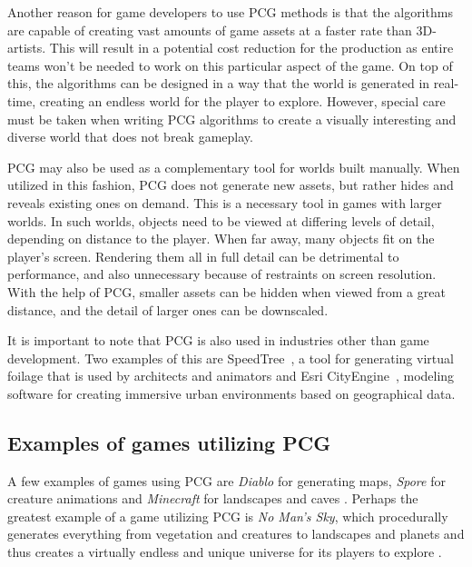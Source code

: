  
Another reason for game developers to use PCG methods is that the algorithms are capable of creating vast amounts of game assets at a faster rate than 3D-artists. This will result in a potential cost reduction for the production as entire teams won't be needed to work on this particular aspect of the game. On top of this, the algorithms can be designed in a way that the world is generated in real-time, creating an endless world for the player to explore. However, special care must be taken when writing PCG algorithms to create a visually interesting and diverse world that does not break gameplay.



PCG may also be used as a complementary tool for worlds built manually. When utilized in this fashion, PCG does not generate new assets, but rather hides and reveals existing ones on demand. This is a necessary tool in games with larger worlds. In such worlds, objects need to be viewed at differing levels of detail, depending on distance to the player. When far away, many objects fit on the player's screen. Rendering them all in full detail can be detrimental to performance, and also unnecessary because of restraints on screen resolution. With the help of PCG, smaller assets can be hidden when viewed from a great distance, and the detail of larger ones can be downscaled. \cite[p. 57]{shaker2016procedural}

It is important to note that PCG is also used in industries other than game development. Two examples of this are SpeedTree~\cite{SpeedTree}, a tool for generating virtual foilage that is used by architects and animators and Esri CityEngine~\cite{CityEngine}, modeling software for creating immersive urban environments based on geographical data.


\subsection{Examples of games utilizing PCG}

A few examples of games using PCG are \textit{Diablo} for generating maps, \textit{Spore} for creature animations and \textit{Minecraft} for landscapes and caves \cite[p. 5]{shaker2016procedural}. Perhaps the greatest example of a game utilizing PCG is \textit{No Man's Sky}, which procedurally generates everything from vegetation and creatures to landscapes and planets and thus creates a virtually endless and unique universe for its players to explore \cite{MIT_No_Mans_Sky}.

